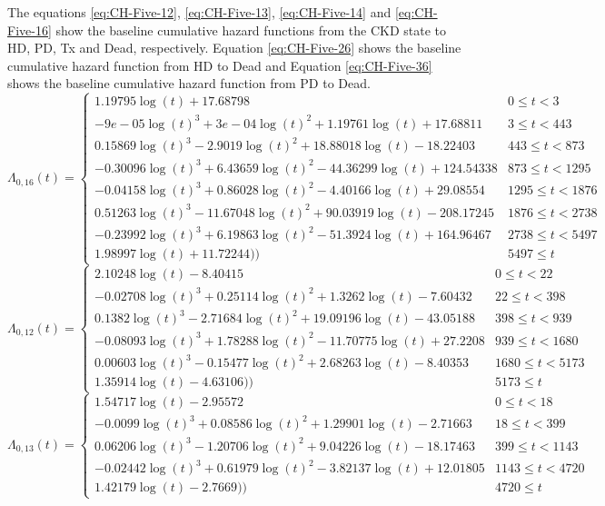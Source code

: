 \documentclass[12pt,PhD,twoside,openright]{muthesis}
\begin{document}
The equations \eqref{eq:CH-Five-12}, \eqref{eq:CH-Five-13}, \eqref{eq:CH-Five-14} and \eqref{eq:CH-Five-16} show the baseline cumulative hazard functions from the CKD state to HD, PD, Tx and Dead, respectively. Equation \eqref{eq:CH-Five-26} shows the baseline cumulative hazard function from HD to Dead and Equation \eqref{eq:CH-Five-36} shows the baseline cumulative hazard function from PD to Dead.
\begin{equation}
\Lambda_{0,16}(t)=\begin{cases} 1.19795\log(t)+17.68798 & 0 \le t < 3 \\ -9e-05\log(t)^3+3e-04\log(t)^2+1.19761\log(t)+17.68811 & 3 \le t < 443 \\ 0.15869\log(t)^3-2.9019\log(t)^2+18.88018\log(t)-18.22403 & 443 \le t < 873 \\ -0.30096\log(t)^3+6.43659\log(t)^2-44.36299\log(t)+124.54338 & 873 \le t < 1295 \\ -0.04158\log(t)^3+0.86028\log(t)^2-4.40166\log(t)+29.08554 & 1295 \le t < 1876 \\ 0.51263\log(t)^3-11.67048\log(t)^2+90.03919\log(t)-208.17245 & 1876 \le t < 2738 \\ -0.23992\log(t)^3+6.19863\log(t)^2-51.3924\log(t)+164.96467 & 2738 \le t < 5497 \\ 1.98997\log(t)+11.72244)) & 5497 \le t \label{eq:CH-Five-16}\end{cases}
\end{equation}
\begin{equation}
\Lambda_{0,12}(t)=\begin{cases} 2.10248\log(t)-8.40415 & 0 \le t < 22 \\ -0.02708\log(t)^3+0.25114\log(t)^2+1.3262\log(t)-7.60432 & 22 \le t < 398 \\ 0.1382\log(t)^3-2.71684\log(t)^2+19.09196\log(t)-43.05188 & 398 \le t < 939 \\ -0.08093\log(t)^3+1.78288\log(t)^2-11.70775\log(t)+27.2208 & 939 \le t < 1680 \\ 0.00603\log(t)^3-0.15477\log(t)^2+2.68263\log(t)-8.40353 & 1680 \le t < 5173 \\ 1.35914\log(t)-4.63106)) & 5173 \le t \label{eq:CH-Five-12}\end{cases}
\end{equation}
\begin{equation}
\Lambda_{0,13}(t)=\begin{cases} 1.54717\log(t)-2.95572 & 0 \le t < 18 \\ -0.0099\log(t)^3+0.08586\log(t)^2+1.29901\log(t)-2.71663 & 18 \le t < 399 \\ 0.06206\log(t)^3-1.20706\log(t)^2+9.04226\log(t)-18.17463 & 399 \le t < 1143 \\ -0.02442\log(t)^3+0.61979\log(t)^2-3.82137\log(t)+12.01805 & 1143 \le t < 4720 \\ 1.42179\log(t)-2.7669)) & 4720 \le t \label{eq:CH-Five-13}\end{cases}
\end{equation}
\end{document}
